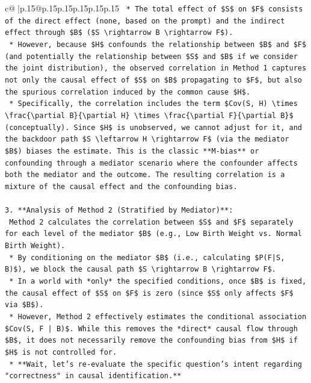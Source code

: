 \documentclass{article}
\begin{document}
{\begin{supertabular}{c@{$\;$}|p{.15\linewidth}@{}p{.15\linewidth}p{.15\linewidth}p{.15\linewidth}p{.15\linewidth}p{.15\linewidth}}
{{{\texttt{    *   The total effect of \$S\$ on \$F\$ consists of the direct effect (none, based on the prompt) and the indirect effect through \$B\$ (\$S \textbackslash{}rightarrow B \textbackslash{}rightarrow F\$).} \\
\texttt{    *   However, because \$H\$ confounds the relationship between \$B\$ and \$F\$ (and potentially the relationship between \$S\$ and \$B\$ if we consider the joint distribution), the observed correlation in Method 1 captures not only the causal effect of \$S\$ on \$B\$ propagating to \$F\$, but also the spurious correlation induced by the common cause \$H\$.} \\
\texttt{    *   Specifically, the correlation includes the term \$Cov(S, H) \textbackslash{}times \textbackslash{}frac\{\textbackslash{}partial B\}\{\textbackslash{}partial H\} \textbackslash{}times \textbackslash{}frac\{\textbackslash{}partial F\}\{\textbackslash{}partial B\}\$ (conceptually). Since \$H\$ is unobserved, we cannot adjust for it, and the backdoor path \$S \textbackslash{}leftarrow H \textbackslash{}rightarrow F\$ (via the mediator \$B\$) biases the estimate. This is the classic **M{-}bias** or confounding through a mediator scenario where the confounder affects both the mediator and the outcome. The resulting correlation is a mixture of the causal effect and the confounding bias.} \\
\\ 
\texttt{3.  **Analysis of Method 2 (Stratified by Mediator)**:} \\
\texttt{    Method 2 calculates the correlation between \$S\$ and \$F\$ separately for each level of the mediator \$B\$ (e.g., Low Birth Weight vs. Normal Birth Weight).} \\
\texttt{    *   By conditioning on the mediator \$B\$ (i.e., calculating \$P(F|S, B)\$), we block the causal path \$S \textbackslash{}rightarrow B \textbackslash{}rightarrow F\$.} \\
\texttt{    *   In a world with *only* the specified conditions, once \$B\$ is fixed, the causal effect of \$S\$ on \$F\$ is zero (since \$S\$ only affects \$F\$ via \$B\$).} \\
\texttt{    *   However, Method 2 effectively estimates the conditional association \$Cov(S, F | B)\$. While this removes the *direct* causal flow through \$B\$, it does not necessarily remove the confounding bias from \$H\$ if \$H\$ is not controlled for.} \\
\texttt{    *   **Wait, let's re{-}evaluate the specific question's intent regarding "correctness" in causal identification.**} \\
}}}
\end{supertabular}}
\end{document}
